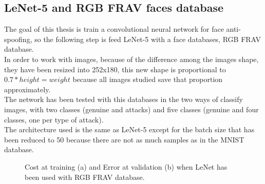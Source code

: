 \subsection{LeNet-5 and RGB FRAV faces database}
The goal of this thesis is train a convolutional neural network for face anti-spoofing, so the following step is feed LeNet-5 with a face databases, RGB FRAV database.\\

In order to work with images, because of the difference among the images shape, they have been resized into 252x180, this new shape is proportional to $0.7*height = weight$ because all images studied save that proportion approximately.\\

The network has been tested with this databases in the two ways of classify images, with two classes (genuine and attacks) and five classes (genuine and four classes, one per type of attack).\\ %

The architecture used is the same as LeNet-5 except for the batch size that has been reduced to 50 because there are not as much samples as in the MNIST database.\\

\begin{figure}[htb]
\centering
{}
\caption{Cost at training (a) and Error at validation (b) when LeNet has been used with RGB FRAV database.}
\label{fig:Lenet_FRAV}
\end{figure}

